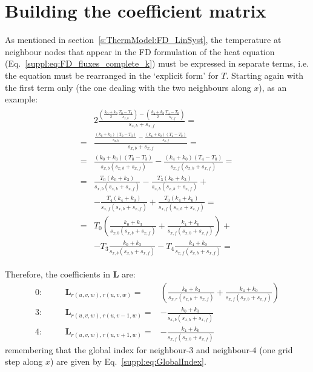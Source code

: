 \section{Building the coefficient matrix}
\label{s:ThermModel:FD_CoeffMatrix}
As mentioned in section~\ref{s:ThermModel:FD_LinSyst}, the temperature at neighbour nodes that appear in the FD formulation of the heat equation (Eq.~\ref{suppl:eq:FD_fluxes_complete_k}) must be expressed in separate terms, i.e. the equation must be rearranged in the `explicit form' for $T$.
Starting again with the first term only (the one dealing with the two neighbours along $x$), as an example:
\begin{align}
\begin{split}  
    \label{suppl:eq:FD_fluxes_complete_k_x_term}
    & 2 \frac{
        \left(
            \displaystyle \frac{k_0 + k_3}{2}
            \displaystyle \frac{T_0 - T_3}{s_{x,b}}
        \right ) -
        \left(
            \displaystyle \frac{k_4 + k_0}{2}
            \displaystyle \frac{T_4 - T_0}{s_{x,f}}
        \right )
    }{s_{x,b} + s_{x,f}} = \\[2ex]
    = &
    \frac{
        \displaystyle\frac{(k_0 + k_3) (T_0 - T_3)}{s_{x,b}} -
        \displaystyle\frac{(k_4 + k_0) (T_4 - T_0)}{s_{x,f}}
        }
    {s_{x,b} + s_{x,f}} = \\[2ex]
    = &
    \frac{(k_0 + k_3) (T_0 - T_3)}{s_{x,b} (s_{x,b} + s_{x,f})} -
    \frac{(k_4 + k_0) (T_4 - T_0)}{s_{x,f} (s_{x,b} + s_{x,f})} = \\[2ex]
    = &
    \frac{T_0 (k_0 + k_3)}{s_{x,b} (s_{x,b} + s_{x,f})} -
    \frac{T_3 (k_0 + k_3)}{s_{x,b} (s_{x,b} + s_{x,f})} + \\
    & - \frac{T_4 (k_4 + k_0)}{s_{x,f} (s_{x,b} + s_{x,f})} +
    \frac{T_0 (k_4 + k_0)}{s_{x,f} (s_{x,b} + s_{x,f})} = \\[2ex]
    = &
    T_0 \left(
        \frac{k_0 + k_3}{s_{x,b} (s_{x,b} + s_{x,f})} +
        \frac{k_4 + k_0}{s_{x,f} (s_{x,b} + s_{x,f})}
    \right) + \\
    & - T_3 \frac{k_0 + k_3}{s_{x,b} (s_{x,b} + s_{x,f})}
    - T_4 \frac{k_4 + k_0}{s_{x,f} (s_{x,b} + s_{x,f})} =
\end{split}
\end{align}

Therefore, the coefficients in $\bm{L}$ are:
\begin{align}
    \label{suppl:eq:L_coefficients_x_term}
    0: &&\quad \bm{L}_{r(u,v,w),r(u,v,w)} = & \left(
        \frac{k_0 + k_3}{s_{x,r} (s_{x,b} + s_{x,f})} +
        \frac{k_4 + k_0}{s_{x,f} (s_{x,b} + s_{x,f})} \right) \\[2ex]
    3: &&\quad \bm{L}_{r(u,v,w),r(u,v-1,w)} = & - \frac{k_0 + k_3}{s_{x,b} (s_{x,b} + s_{x,f})} \\[2ex]
    4: &&\quad \bm{L}_{r(u,v,w),r(u,v+1,w)} = & - \frac{k_4 + k_0}{s_{x,f} (s_{x,b} + s_{x,f})}
\end{align}
remembering that the global index for neighbour-$3$ and neighbour-$4$ (one grid step along $x$) are given by Eq.~\ref{suppl:eq:GlobalIndex}.

